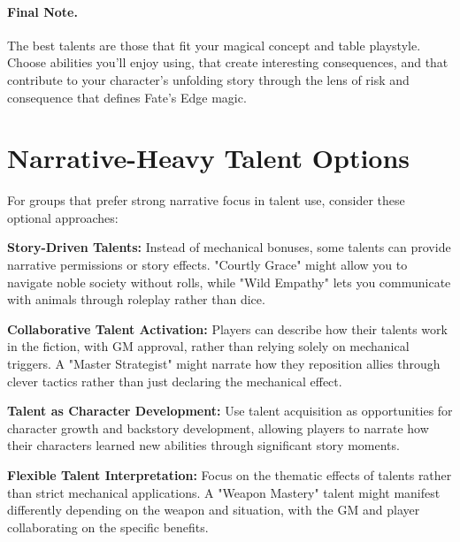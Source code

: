\paragraph{Final Note.}
The best talents are those that fit your magical concept and table playstyle. Choose abilities you'll enjoy using, that create interesting consequences, and that contribute to your character's unfolding story through the lens of risk and consequence that defines Fate's Edge magic.

\section{Narrative-Heavy Talent Options}

For groups that prefer strong narrative focus in talent use, consider these optional approaches:

\textbf{Story-Driven Talents:} Instead of mechanical bonuses, some talents can provide narrative permissions or story effects. "Courtly Grace" might allow you to navigate noble society without rolls, while "Wild Empathy" lets you communicate with animals through roleplay rather than dice.

\textbf{Collaborative Talent Activation:} Players can describe how their talents work in the fiction, with GM approval, rather than relying solely on mechanical triggers. A "Master Strategist" might narrate how they reposition allies through clever tactics rather than just declaring the mechanical effect.

\textbf{Talent as Character Development:} Use talent acquisition as opportunities for character growth and backstory development, allowing players to narrate how their characters learned new abilities through significant story moments.

\textbf{Flexible Talent Interpretation:} Focus on the thematic effects of talents rather than strict mechanical applications. A "Weapon Mastery" talent might manifest differently depending on the weapon and situation, with the GM and player collaborating on the specific benefits.
